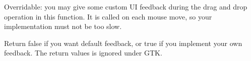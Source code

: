 \label{wxdropsourcegivefeedback}


Overridable: you may give some custom UI feedback during the drag and drop operation
in this function. It is called on each mouse move, so your implementation must not be too
slow.





Return false if you want default feedback, or true if you implement your own
feedback. The return values is ignored under GTK.

